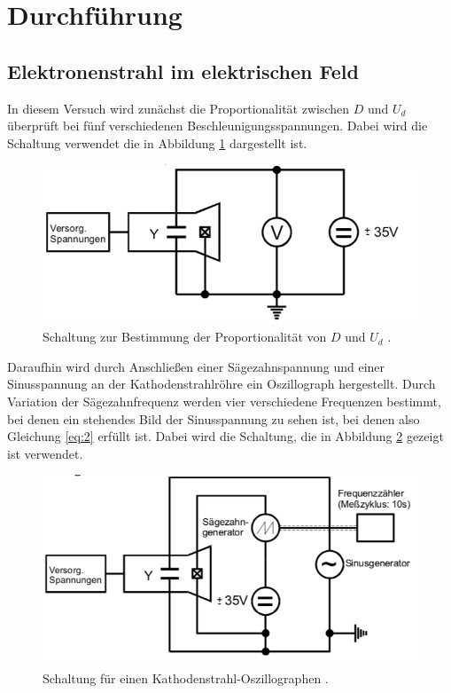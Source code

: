 \section{Durchführung}

\subsection{Elektronenstrahl im elektrischen Feld}

In diesem Versuch wird zunächst die Proportionalität zwischen $D$ und $U_d$
überprüft bei fünf verschiedenen Beschleunigungsspannungen. Dabei wird die Schaltung
verwendet die in Abbildung \ref{abb:3} dargestellt ist.

\begin{figure}[H]
  \centering
  \includegraphics[width=\textwidth]{content/Schaltung1.png}
  \caption{Schaltung zur Bestimmung der Proportionalität von $D$ und $U_d$ \cite{1}.}
  \label{abb:3}
\end{figure}

Daraufhin wird durch Anschließen einer Sägezahnspannung und einer Sinusspannung an
der Kathodenstrahlröhre ein Oszillograph hergestellt. Durch Variation der Sägezahnfrequenz
werden vier verschiedene Frequenzen bestimmt, bei denen ein stehendes Bild der Sinusspannung
zu sehen ist, bei denen also Gleichung \ref{eq:2} erfüllt ist. Dabei wird die Schaltung, die in
Abbildung \ref{abb:4} gezeigt ist verwendet.

\begin{figure}[H]
  \centering
  \includegraphics[width=\textwidth]{content/Schaltung2.png}
  \caption{Schaltung für einen Kathodenstrahl-Oszillographen \cite{1}.}
  \label{abb:4}
\end{figure}

